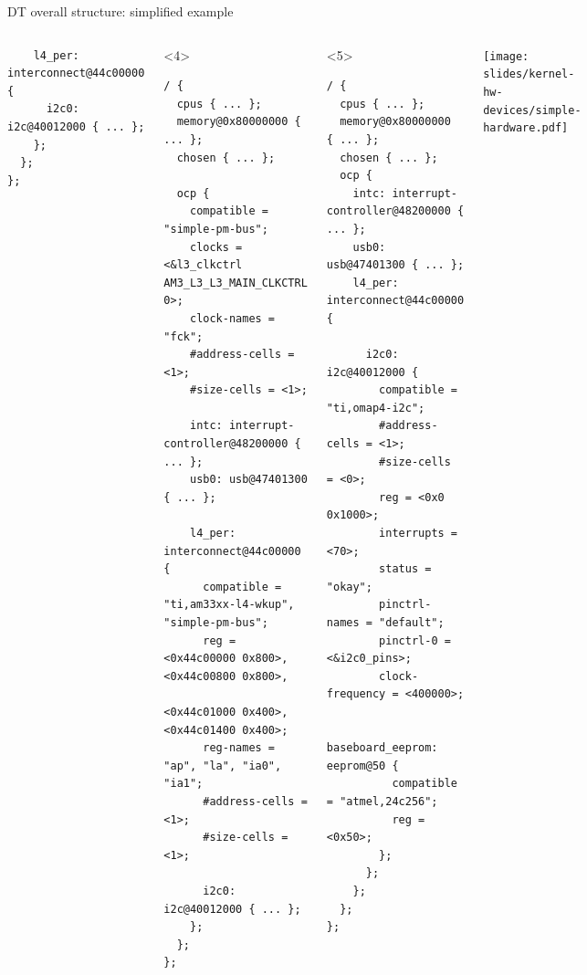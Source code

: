 \begin{frame}[fragile]{DT overall structure: simplified example}
\begin{columns}
\begin{onlyenv}
\begin{block}{}
\begin{verbatim}
    l4_per: interconnect@44c00000 {
      i2c0: i2c@40012000 { ... };
    };
  };
};
\end{verbatim}
      \end{block}
    \end{onlyenv}
    \begin{onlyenv}<4>
      \begin{block}{}
\begin{verbatim}
/ {
  cpus { ... };
  memory@0x80000000 { ... };
  chosen { ... };

  ocp {
    compatible = "simple-pm-bus";
    clocks = <&l3_clkctrl AM3_L3_L3_MAIN_CLKCTRL 0>;
    clock-names = "fck";
    #address-cells = <1>;
    #size-cells = <1>;

    intc: interrupt-controller@48200000 { ... };
    usb0: usb@47401300 { ... };

    l4_per: interconnect@44c00000 {
      compatible = "ti,am33xx-l4-wkup", "simple-pm-bus";
      reg = <0x44c00000 0x800>, <0x44c00800 0x800>,
            <0x44c01000 0x400>, <0x44c01400 0x400>;
      reg-names = "ap", "la", "ia0", "ia1";
      #address-cells = <1>;
      #size-cells = <1>;

      i2c0: i2c@40012000 { ... };
    };
  };
};
\end{verbatim}
      \end{block}
    \end{onlyenv}
    \begin{onlyenv}<5>
      \begin{block}{}
\begin{verbatim}
/ {
  cpus { ... };
  memory@0x80000000 { ... };
  chosen { ... };
  ocp {
    intc: interrupt-controller@48200000 { ... };
    usb0: usb@47401300 { ... };
    l4_per: interconnect@44c00000 {

      i2c0: i2c@40012000 {
        compatible = "ti,omap4-i2c";
        #address-cells = <1>;
        #size-cells = <0>;
        reg = <0x0 0x1000>;
        interrupts = <70>;
        status = "okay";
        pinctrl-names = "default";
        pinctrl-0 = <&i2c0_pins>;
        clock-frequency = <400000>;

        baseboard_eeprom: eeprom@50 {
          compatible = "atmel,24c256";
          reg = <0x50>;
        };
      };
    };
  };
};
\end{verbatim}
      \end{block}
    \end{onlyenv}
    \texttt{[image: slides/kernel-hw-devices/simple-hardware.pdf]}
  \end{columns}
\end{frame}

